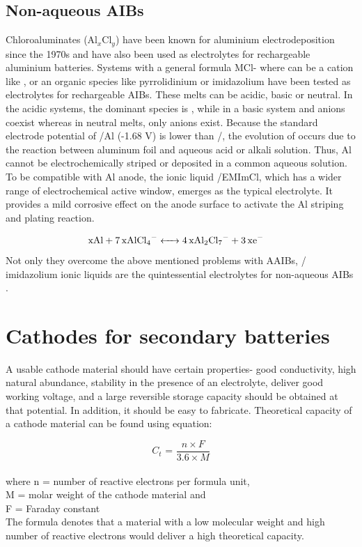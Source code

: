 \subsection{Non-aqueous AIBs}
Chloroaluminates (Al$_x$Cl$_y$) have been known for aluminium electrodeposition since the 1970s and have also been used as electrolytes for rechargeable aluminium batteries\cite{weppner_ionic_1976, fung_reaction_1972}. Systems with a general formula MCl- where  can be a cation like ,  or an organic species like pyrrolidinium or imidazolium have been tested as electrolytes for rechargeable AIBs\cite{das_aluminium-ion_2017}. These melts can be acidic, basic or neutral. In the acidic systems, the dominant species is , while in a basic system  and  anions coexist whereas in neutral melts, only  anions exist. Because the standard electrode potential of /Al (-1.68 V) is lower than /, the evolution of  occurs due to the reaction between aluminum foil and aqueous acid or alkali solution. Thus, Al cannot be electrochemically striped or deposited in a common aqueous solution. To be compatible with Al anode, the ionic liquid /EMImCl, which has a wider range of electrochemical active window, emerges as the typical electrolyte. It provides a mild corrosive effect on the anode surface to activate the Al striping and plating reaction. 

\begin{align*}
        \ce{xAl + 7x\ce{AlCl4-} &<-> 4x\ce{Al2Cl7-} + 3x\ce{e-}}
\end{align*}
Not only they overcome the above mentioned problems with AAIBs, / imidazolium ionic liquids are the quintessential electrolytes for non-aqueous AIBs \cite{jayaprakash_rechargeable_2011, lin_ultrafast_2015-3,wang_new_2013-1,rani_fluorinated_2013}. 

\section{Cathodes for secondary batteries}
A usable cathode material should have certain properties- good conductivity, high natural abundance, stability in the presence of an electrolyte, deliver good working voltage, and a large reversible storage capacity should be obtained at that potential. In addition, it should be easy to fabricate. Theoretical capacity of a cathode material can be found using equation:

\begin{equation} \label{eq3}
   C_{t} \text{ = } \frac{n \times F}{3.6 \times M}
\end{equation}\\
where n = number of reactive electrons per formula unit,\\
M = molar weight of the cathode material and\\
F = Faraday constant\\
The formula denotes that a material with a low molecular weight and high number of reactive electrons would deliver a high theoretical capacity.

